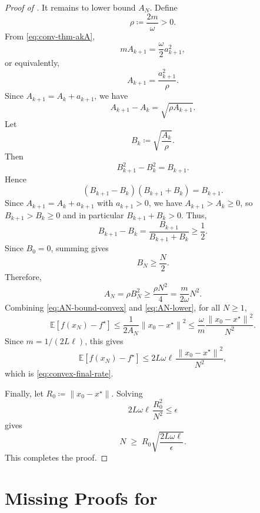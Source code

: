 \documentclass[10pt]{article}
\newcommand{\E}{\mathbb{E}}
\newcommand{\norm}[1]{\left\|#1\right\|}
\begin{document}
\begin{proof}[Proof of ]
It remains to lower bound \(A_N\). Define
\[
\rho\coloneqq\frac{2m}{\omega}>0.
\]
From \eqref{eq:conv-thm-akA},
\[
mA_{k+1}=\frac{\omega}{2}a_{k+1}^2,
\]
or equivalently,
\[
A_{k+1}=\frac{a_{k+1}^2}{\rho}.
\]
Since \(A_{k+1}=A_k+a_{k+1}\), we have
\[
A_{k+1}-A_k=\sqrt{\rho A_{k+1}}.
\]
Let
\[
B_k\coloneqq\sqrt{\frac{A_k}{\rho}}.
\]
Then
\[
B_{k+1}^2-B_k^2=B_{k+1}.
\]
Hence
\[
(B_{k+1}-B_k)(B_{k+1}+B_k)=B_{k+1}.
\]
Since \(A_{k+1}=A_k+a_{k+1}\) with \(a_{k+1}>0\), we have \(A_{k+1}>A_k\ge 0\), so
\(B_{k+1}> B_k\ge 0\) and in particular \(B_{k+1}+B_k>0\). 
Thus,
\[
B_{k+1}-B_k=\frac{B_{k+1}}{B_{k+1}+B_k}\ge \frac12.
\]
Since \(B_0=0\), summing gives
\[
B_N\ge \frac{N}{2}.
\]
Therefore,
\begin{equation}
A_N
=
\rho B_N^2
\ge
\frac{\rho N^2}{4}
=
\frac{m}{2\omega}N^2.
\label{eq:AN-lower}
\end{equation}
Combining \eqref{eq:AN-bound-convex} and \eqref{eq:AN-lower}, for all \(N\ge1\),
\[
\E[f(x_N)-f^\star]
\le
\frac{1}{2A_N}\norm{x_0-x^\star}^2
\le
\frac{\omega}{m}\frac{\norm{x_0-x^\star}^2}{N^2}.
\]
Since \(m=1/(2L\ell)\), this gives
\begin{equation}
\E[f(x_N)-f^\star]
\le
2L\omega\ell\,
\frac{\norm{x_0-x^\star}^2}{N^2},
\end{equation}
which is \eqref{eq:convex-final-rate}.

Finally, let \(R_0\coloneqq\norm{x_0-x^\star}\). Solving
\[
2L\omega\ell\,\frac{R_0^2}{N^2}\le \epsilon
\]
gives
\[
N \;\ge\; R_0\sqrt{\frac{2L\omega\ell}{\epsilon}}.
\]
This completes the proof.



\end{proof}




\section{Missing Proofs for  }
\label{app:missing-proofs-strong}
\end{document}
